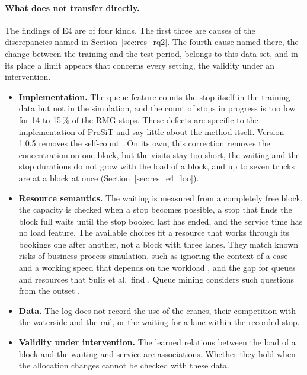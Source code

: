 \paragraph{What does not transfer directly.} The findings of E4 are of four
kinds. The first three are causes of the discrepancies named in
Section~\ref{sec:res_rq2}. The fourth cause named there, the change between the
training and the test period, belongs to this data set, and in its place a limit appears that concerns
every setting, the validity under an intervention.
\begin{itemize}
\item \textbf{Implementation.} The queue feature counts the stop itself in the
training data but not in the simulation, and the count of stops in progress is too low for 14 to
15\,\% of the RMG stops. These defects are specific to the implementation of ProSiT
and say little about the method itself. Version 1.0.5 removes the self-count
\cite{ProSiTRepository}. On its own, this correction removes the concentration on one
block, but the visits stay too short, the waiting and the stop durations do not grow
with the load of a block, and up to seven trucks are at a block at once
(Section~\ref{sec:res_e4_loo}).
\item \textbf{Resource semantics.} The waiting is measured from a completely free
block, the capacity is checked when a stop becomes possible, a stop that finds the
block full waits until the stop booked last has ended, and the service time has no
load feature. The available
choices fit a resource that works through its bookings one after another, not a
block with three lanes. They match known risks of business process simulation, such as
ignoring the context of a case and a working speed that depends on the workload
\cite{Aalst2015}, and the gap for queues and resources that Sulis et al.\ find
\cite{Sulis2026SimulationReview}. Queue mining considers such questions from the outset
\cite{Senderovich2015QueueMining}.
\item \textbf{Data.} The log does not record the use of the cranes, their competition
with the waterside and the rail, or the waiting for a lane within the recorded stop.
\item \textbf{Validity under intervention.} The learned relations between the load of
a block and the waiting and service are associations. Whether they hold when the
allocation changes cannot be checked with these data.
\end{itemize}

